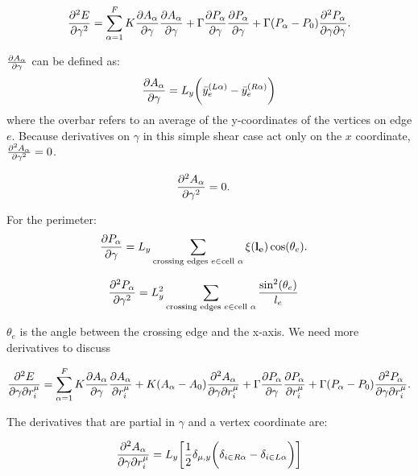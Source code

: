 \documentclass[12pt,a4paper]{article}
\begin{document}
\begin{equation}
	\label{eqn: dedgammadgamma_resum}
	\pdv[2]{E}{\gamma} = \sum\limits_{\alpha=1}^{F}K \pdv{A_\alpha}{\gamma} \pdv{A_\alpha}{\gamma} + \Gamma \pdv{P_\alpha}{\gamma} \pdv{P_\alpha}{\gamma} + \Gamma (P_\alpha - P_0)  \pdv[2]{P_{\alpha}}{\gamma}{\gamma}.
\end{equation}

$\pdv{A_\alpha}{\gamma}$ can be defined as:
\begin{align}
	\label{eqn: dadgamma_resum}
	\pdv{A_\alpha}{\gamma} =  L_y\bigg(\bar{y}_e^{(L\alpha)} - \bar{y}_e^{(R\alpha)}\bigg)
\end{align}
where the overbar refers to an average of the y-coordinates of the vertices on edge $e$. Because derivatives on $\gamma$ in this simple shear case act only on the $x$ coordinate, $\pdv[2]{A_\alpha}{\gamma} = 0$. 


\begin{align}
	\label{eqn: dAdgamma_resum}
	\pdv[2]{A_\alpha}{\gamma} &= 0.
\end{align}

For the perimeter:
\begin{align}
	\label{eqn: dPdgamma_resum}
	\pdv{P_\alpha}{\gamma} &= L_y \sum\limits_{ \text{crossing edges } e \in \text{cell } \alpha} \xi(\vb{l_e}) \cos(\theta_{e}).
\end{align}


\begin{align}
	\label{eqn: dPdgammadgamma_resum}
	\pdv[2]{P_\alpha}{\gamma} &= L_y^2 \sum\limits_{ \text{crossing edges } e \in \text{cell } \alpha} \frac{\sin^2(\theta_{e})}{l_e}
\end{align}

$\theta_e$ is the angle between the crossing edge and the x-axis. We need more derivatives to discuss

\begin{align}
	\label{eqn: dedgammadr_resum}
	\pdv[2]{E}{\gamma}{r_i^\mu} &= \sum\limits_{\alpha=1}^{F}K \pdv{A_\alpha}{\gamma} \pdv{A_\alpha}{r_i^\mu} + K (A_\alpha - A_0) \pdv{A_\alpha}{\gamma}{r_i^\mu} + \Gamma \pdv{P_\alpha}{\gamma} \pdv{P_\alpha}{r_i^\mu} + \Gamma (P_\alpha - P_0)  \pdv[2]{P_{\alpha}}{\gamma}{r_i^\mu}. \\
\end{align}

The derivatives that are partial in $\gamma$ and a vertex coordinate are:

\begin{align}
	\label{eqn: dadgammadr_resum}
	\pdv{A_{\alpha}}{\gamma}{r_i^\mu} = L_y\bigg[\frac{1}{2}\delta_{\mu,y}\bigg(\delta_{i\in R\alpha} - \delta_{i\in L\alpha}\bigg) \bigg]
\end{align}
\end{document}
